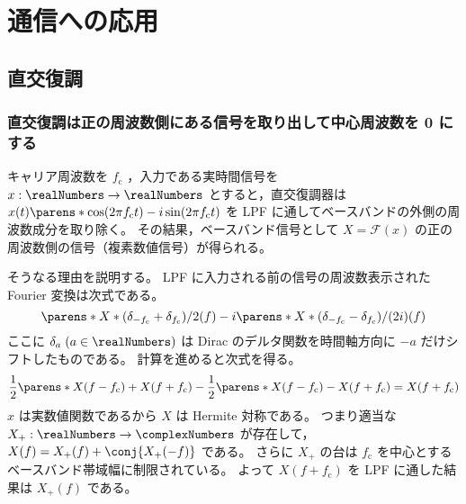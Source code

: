 \chapter{通信への応用}
    \section{直交復調}
        \newcommand*{\fc}{f_\text{c}}
        \subsection{直交復調は正の周波数側にある信号を取り出して中心周波数を 0 にする}
            キャリア周波数を $\fc$ ，入力である実時間信号を $x:\realNumbers\to\realNumbers$ とすると，直交復調器は $x(t)\parens*{\cos(2\pi \fc t) - i\sin(2\pi \fc t)}$ を LPF に通してベースバンドの外側の周波数成分を取り除く。
            その結果，ベースバンド信号として $X = \mathcal{F}(x)$ の正の周波数側の信号（複素数値信号）が得られる。
            \par
            そうなる理由を説明する。
            LPF に入力される前の信号の周波数表示された Fourier 変換は次式である。
            \[ \parens*{X*(\delta_{-\fc} + \delta_{\fc})/2}(f) - i\parens*{X*(\delta_{-\fc} - \delta_{\fc})/(2i)}(f) \]
            ここに $\delta_a\;(a\in\realNumbers)$ は Dirac のデルタ関数を時間軸方向に $-a$ だけシフトしたものである。
            計算を進めると次式を得る。
            \[ \frac{1}{2}\parens*{X(f-\fc)+X(f+\fc)} - \frac{1}{2}\parens*{X(f-\fc)-X(f+\fc)} = X(f+\fc) \]
            $x$ は実数値関数であるから $X$ は Hermite 対称である。
            つまり適当な $X_+:\realNumbers\to\complexNumbers$ が存在して，$X(f) = X_+(f) + \conj{X_+(-f)}$ である。
            さらに $X_+$ の台は $\fc$ を中心とするベースバンド帯域幅に制限されている。
            よって $X(f+\fc)$ を LPF に通した結果は $X_+(f)$ である。
